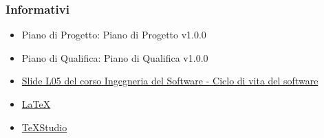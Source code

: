 \subsubsection{Informativi}
\begin{itemize}
	\item Piano di Progetto: Piano di Progetto v1.0.0
	\item Piano di Qualifica: Piano di Qualifica v1.0.0 
	\item \href{https://www.math.unipd.it/~tullio/IS-1/2019/Dispense/L05.pdf}{Slide L05 del corso Ingegneria del Software - Ciclo di vita del software}
	\item \href{https://www.latex-project.org/help/documentation/}{\LaTeX}
	\item \href{https://www.texstudio.org/}{TeXStudio}
\end{itemize}

